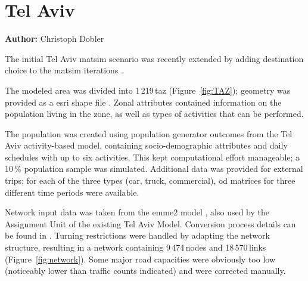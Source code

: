 \chapter{Tel Aviv}
\label{ch:telaviv}
\hfill \textbf{Author:} Christoph Dobler


The initial Tel Aviv \gls{matsim} scenario \citep[][]{BekhorEtAl_TRB_2011} was recently extended by adding destination choice to the \gls{matsim} iterations \citep[][]{DoblerEtAl_TechRep_IVT_2014}.

The modeled area was divided into 1\,219\,\gls{taz} (Figure~\ref{fig:TAZ}); geometry was provided as a \gls{esri} shape file \citep{ESRI-ShapeFile_manual_1998}. Zonal attributes contained information on the population living in the zone, as well as types of activities that can be performed.

The population was created using population generator outcomes from the Tel Aviv activity-based model, containing socio-demographic attributes and daily schedules with up to six activities. This kept computational effort manageable; a 10\,\% population sample was simulated. Additional data was provided for external trips; for each of the three types (car, truck, commercial), \gls{od} matrices for three different time periods were available.

Network input data was taken from the \gls{emme2} model \citep[see][]{EMME_Webpage_2015}, also used by the Assignment Unit of the existing Tel Aviv Model. Conversion process details can be found in \citet{GaoWEtAl_TRR_2010}. Turning restrictions were handled by adapting the network structure, resulting in a network containing 9\,474\,nodes and 18\,570\,links (Figure~\ref{fig:network}). Some major road capacities were obviously too low (\eg noticeably lower than traffic counts indicated) and were corrected manually.

